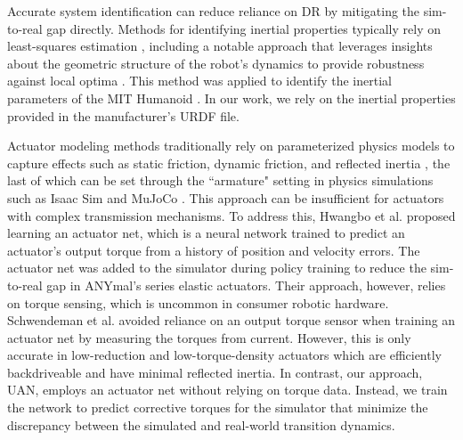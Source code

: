 Accurate system identification can reduce reliance on DR by mitigating the sim-to-real gap directly.
Methods for identifying inertial properties typically rely on least-squares estimation \cite{AtkesonEstimation}, including a notable approach that leverages insights about the geometric structure of the robot's dynamics to provide robustness against local optima \cite{LeeGeometric}. This method was applied to identify the inertial parameters of the MIT Humanoid \cite{SchwendemanHumanoidSysID}. In our work, we rely on the inertial properties provided in the manufacturer's URDF file.


Actuator modeling methods traditionally rely on parameterized physics models to capture effects such as static friction, dynamic friction, and reflected inertia \cite{disneyBDX}, the last of which can be set through the ``armature" setting in physics simulations such as Isaac Sim \cite{makoviychuk2021isaac} and MuJoCo \cite{mujoco}. This approach can be insufficient for actuators with complex transmission mechanisms. To address this, Hwangbo et al. \cite{Hwangbo_2019} proposed learning an actuator net, which is a neural network trained to predict an actuator's output torque from a history of position and velocity errors. The actuator net was added to the simulator during policy training to reduce the sim-to-real gap in ANYmal's series elastic actuators. Their approach, however, relies on torque sensing, which is uncommon in consumer robotic hardware. Schwendeman et al. \cite{SchwendemanHumanoidSysID} avoided reliance on an output torque sensor when training an actuator net by measuring the torques from current. However, this is only accurate in low-reduction and low-torque-density actuators which are efficiently backdriveable and have minimal reflected inertia. In contrast, our approach, UAN, employs an actuator net without relying on torque data. Instead, we train the network to predict corrective torques for the simulator that minimize the discrepancy between the simulated and real-world transition dynamics. 

